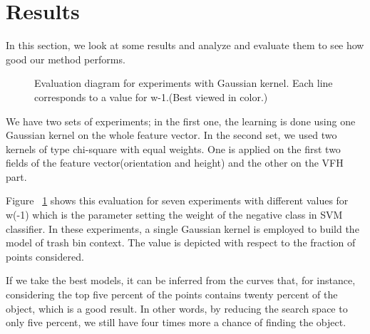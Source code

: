 

\section{Results}
\label{Results.sec}
In this section, we look at some results and analyze and evaluate them to see how good our method performs.



\begin{figure}[t]
  \caption[Evaluation diagram for experiments with Gaussian kernel.]
  {Evaluation diagram for experiments with Gaussian kernel. Each line corresponds to a value for w-1.(Best viewed in color.)}
  \label{evalSevenExp.figure}
\end{figure}
We have two sets of experiments; in the first one, the learning is done using one Gaussian kernel on the whole feature vector.
In the second set, we used two kernels of type chi-square with equal weights.
One is applied on the first two fields of the feature vector(orientation and height) and the other on the VFH part.

Figure ~\ref{evalSevenExp.figure} shows this evaluation for seven experiments with different values for w(-1) which is the 
parameter setting the weight of the negative class in SVM classifier.
In these experiments, a single Gaussian kernel is employed to build the model of trash bin context.
The value is depicted with respect to the fraction of points considered.

If we take the best models, it can be inferred from the curves that, for instance, considering the top five percent of the points 
contains twenty percent of the object, which is a good result. 
In other words, by reducing the search space to only five percent, we still have four times more a chance of finding the object.



